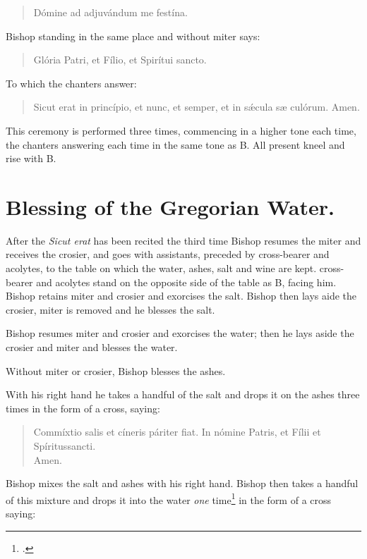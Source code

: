 \documentclass[letterpaper]{report}
\begin{document}
{\begin{quote}
    \rbar Dómine ad adjuvándum me festína.
\end{quote}

Bishop standing in the same place and without miter says:

\begin{quote}
    \vbar Glória Patri, et Fílio, et Spirítui sancto.
\end{quote}

To which the chanters answer:

\begin{quote}
    \rbar Sicut erat in princípio, et nunc, et semper, et in s\'\ae cula s\ae
    culórum. Amen.
\end{quote}

This ceremony is performed three times, commencing in a higher tone each time,
the chanters answering each time in the same tone as B. All present kneel and
rise with B. 

\section{Blessing of the Gregorian Water.}

\rubric After the \textit{Sicut erat} has been recited the third time Bishop
resumes the miter and receives the crosier, and goes with assistants, preceded
by cross-bearer and acolytes, to the table on which the water, ashes, salt and
wine are kept. cross-bearer and acolytes stand on the opposite side of the
table as B, facing him. Bishop retains miter and crosier and exorcises the
salt. Bishop then lays aide the crosier, miter is removed and he blesses the
salt.

\rubric Bishop resumes miter and crosier and exorcises the water; then he lays
aside the crosier and miter and blesses the water. 

\rubric Without miter or crosier, Bishop blesses the ashes.

\rubric With his right hand he takes a handful of the salt and drops it on the
ashes three times in the form of a cross, saying:

\begin{quote}
   Commíxtio salis et cíneris páriter fiat. In nómine Pa\cross tris, et
    Fí\cross lii et Spíritus\cross sancti. \\
   \rbar Amen.
\end{quote}

Bishop mixes the salt and ashes with his right hand. Bishop then takes a handful of this
mixture and drops it into the water \textit{one} time\footcite[The Pontifical
seems to indicate that the bishop performs this ceremony \textit{three times,}
but the authors imply that it is done only \textit{once.}][footnote 1, p.
60.]{consecranda} in the form of a cross saying:

}
\end{document}
